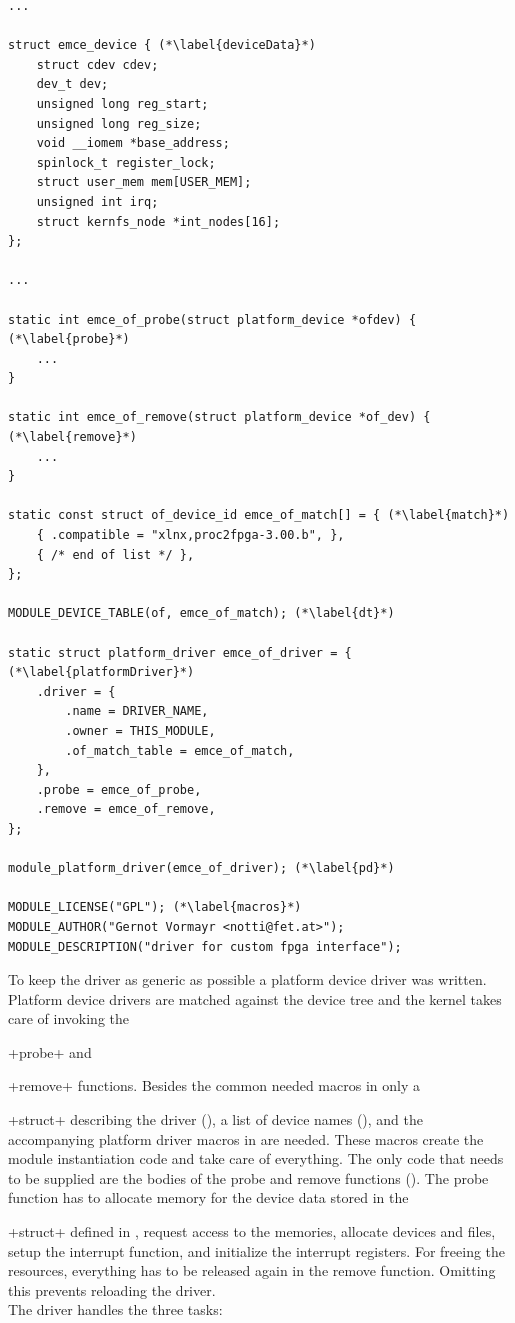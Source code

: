 \documentclass[12pt,a4paper,parskip=full,abstract=true,BCOR=12mm,twoside,open=right]{scrreprt}
\newcommand{\hack}{}
\newcommand*{\SavedLstInline}{}
\DeclareRobustCommand*{\lstinline}{%
  \ifmmode
    \let\SavedBGroup\bgroup
    \def\bgroup{%
      \let\bgroup\SavedBGroup
      \hbox\bgroup
    }%
  \fi
  \SavedLstInline
}
\begin{document}
\begin{lstlisting}[float=htb,caption={Basic elements of a platform driver module},label=src:pdriver,basicstyle=\hack\tiny]
...

struct emce_device { (*\label{deviceData}*)
	struct cdev cdev;
	dev_t dev;
	unsigned long reg_start;
	unsigned long reg_size;
	void __iomem *base_address;
	spinlock_t register_lock;
	struct user_mem mem[USER_MEM];
	unsigned int irq;
	struct kernfs_node *int_nodes[16];
};

...

static int emce_of_probe(struct platform_device *ofdev) { (*\label{probe}*)
	...
}

static int emce_of_remove(struct platform_device *of_dev) { (*\label{remove}*)
	...
}

static const struct of_device_id emce_of_match[] = { (*\label{match}*)
	{ .compatible = "xlnx,proc2fpga-3.00.b", },
	{ /* end of list */ },
};

MODULE_DEVICE_TABLE(of, emce_of_match); (*\label{dt}*)

static struct platform_driver emce_of_driver = { (*\label{platformDriver}*)
	.driver = {
		.name = DRIVER_NAME,
		.owner = THIS_MODULE,
		.of_match_table = emce_of_match,
	},
	.probe = emce_of_probe,
	.remove = emce_of_remove,
};

module_platform_driver(emce_of_driver); (*\label{pd}*)

MODULE_LICENSE("GPL"); (*\label{macros}*)
MODULE_AUTHOR("Gernot Vormayr <notti@fet.at>");
MODULE_DESCRIPTION("driver for custom fpga interface");
\end{lstlisting}

To keep the driver as generic as possible a platform device driver was
written. Platform device drivers are matched against the device tree and
the kernel takes care of invoking the \lstinline+probe+ and
\lstinline+remove+ functions. Besides the common needed macros in
  only a \lstinline+struct+ describing the
driver (), a list of device names (),
and the accompanying platform driver macros in  are needed.
These macros create the module instantiation code and take care of
everything. The only code that needs to be supplied are the bodies of
the probe and remove functions (). The probe function
has to allocate memory for the device data stored in the
\lstinline+struct+ defined in , request access to the
memories, allocate devices and files, setup the interrupt function, and
initialize the interrupt registers. For freeing the resources, everything
has to be released again in the remove function. Omitting this prevents
reloading the driver.\\
The driver handles the three tasks:
\end{document}
